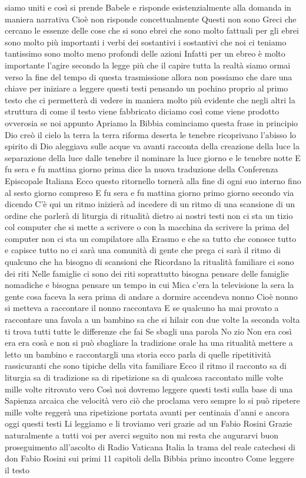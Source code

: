 siamo uniti e così si prende Babele e risponde esistenzialmente alla domanda in maniera narrativa Cioè non risponde concettualmente Questi non sono Greci che cercano le essenze delle cose che si sono ebrei che sono molto fattuali per gli ebrei sono molto più importanti i verbi dei sostantivi i sostantivi che noi ci teniamo tantissimo sono molto meno profondi delle azioni Infatti per un ebreo è molto importante l'agire secondo la legge più che il capire tutta la realtà
siamo ormai verso la fine del tempo di questa trasmissione allora non possiamo che dare una chiave per iniziare a leggere questi testi pensando un pochino proprio al primo testo che ci permetterà di vedere in maniera molto più evidente che negli altri la struttura di come il testo viene fabbricato diciamo così come viene prodotto ovverosia se noi appunto Apriamo la Bibbia cominciamo questa frase in principio Dio creò il cielo la terra la terra riforma deserta le tenebre ricoprivano l'abisso lo spirito di Dio aleggiava sulle acque va avanti racconta della creazione della luce la separazione della luce dalle tenebre il nominare la luce giorno e le tenebre notte E fu sera e fu mattina giorno prima dice la nuova traduzione della Conferenza Episcopale Italiana Ecco questo ritornello tornerà alla fine di ogni
suo interno fino al sesto giorno compreso E fu sera e fu mattina giorno primo giorno secondo via dicendo C'è qui un ritmo inizierà ad incedere di un ritmo di una scansione di un ordine che parlerà di liturgia di ritualità dietro ai nostri testi non ci sta un tizio col computer che si mette a scrivere o con la macchina da scrivere la prima del computer non ci sta un compilatore alla Erasmo e che sa tutto che conosce tutto e capisce tutto no ci sarà una comunità di gente che prega ci sarà il ritmo di qualcuno che ha bisogno di scansioni che Ricordano la ritualità familiare ci sono dei riti Nelle famiglie ci sono dei riti soprattutto bisogna pensare delle
famiglie nomadiche e bisogna pensare un tempo in cui Mica c'era la televisione la sera la gente cosa faceva la sera prima di andare a dormire accendeva nonno Cioè nonno si metteva a raccontare il nonno raccontava E se qualcuno ha mai provato a raccontare una favola a un bambino sa che si hilair con due volte la seconda volta ti trova tutti tutte le differenze che fai Se sbagli una parola No zio Non era così era era cosà e non si può sbagliare la tradizione orale ha una ritualità mettere a letto un bambino e raccontargli una storia ecco parla di quelle ripetitività rassicuranti che sono tipiche della vita familiare Ecco il ritmo il racconto sa di liturgia sa di tradizione sa di ripetizione sa di qualcosa raccontato mille volte mille volte ritrovato vero Così noi dovremo leggere questi testi sulla base di una Sapienza arcaica che
velocità vero ciò che proclama vero sempre lo si può ripetere mille volte reggerà una ripetizione portata avanti per centinaia d'anni e ancora oggi questi testi Li leggiamo e li troviamo veri
 grazie ad un Fabio Rosini Grazie naturalmente a tutti voi per averci seguito non mi resta che augurarvi buon proseguimento all'ascolto di Radio Vaticana Italia
la trama del reale catechesi di don Fabio Rosini sui primi 11 capitoli della Bibbia
 primo incontro Come leggere il testo